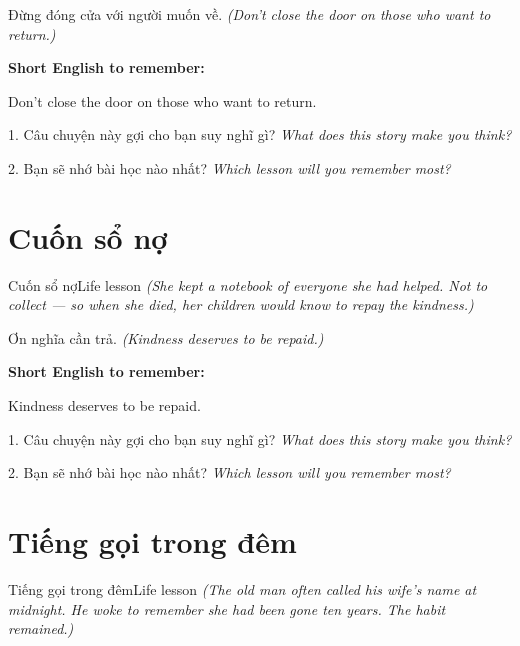 \begin{baihoc}
Đừng đóng cửa với người muốn về.
\textit{(Don't close the door on those who want to return.)}
\end{baihoc}

\begin{ghinhoanh}
\textbf{Short English to remember:}

Don't close the door on those who want to return.

\end{ghinhoanh}

\begin{tuhocnhanh}
1. Câu chuyện này gợi cho bạn suy nghĩ gì? \textit{What does this story make you think?}

2. Bạn sẽ nhớ bài học nào nhất? \textit{Which lesson will you remember most?}
\end{tuhocnhanh}
\ngancach


\section{Cuốn sổ nợ}
\begin{truyen}{Cuốn sổ nợ}{Life lesson}
\textit{(She kept a notebook of everyone she had helped. Not to collect — so when she died, her children would know to repay the kindness.)}
\end{truyen}

\begin{baihoc}
Ơn nghĩa cần trả.
\textit{(Kindness deserves to be repaid.)}
\end{baihoc}

\begin{ghinhoanh}
\textbf{Short English to remember:}

Kindness deserves to be repaid.

\end{ghinhoanh}

\begin{tuhocnhanh}
1. Câu chuyện này gợi cho bạn suy nghĩ gì? \textit{What does this story make you think?}

2. Bạn sẽ nhớ bài học nào nhất? \textit{Which lesson will you remember most?}
\end{tuhocnhanh}
\ngancach


\section{Tiếng gọi trong đêm}
\begin{truyen}{Tiếng gọi trong đêm}{Life lesson}
\textit{(The old man often called his wife's name at midnight. He woke to remember she had been gone ten years. The habit remained.)}
\end{truyen}


